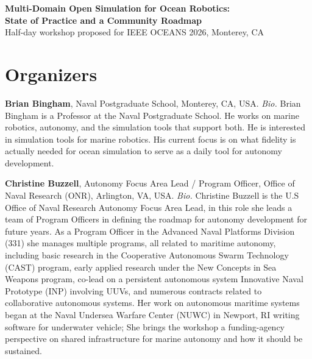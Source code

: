 \documentclass[10pt]{article}
\begin{document}
\vspace*{0.3in}

\begin{center}
  {\Large\bfseries Multi-Domain Open Simulation for Ocean Robotics:\\ State of Practice and a Community Roadmap}\\[2pt]
  {\small Half-day workshop proposed for IEEE OCEANS 2026, Monterey, CA}
\end{center}

\section{Organizers}

\textbf{Brian Bingham}, Naval Postgraduate School, Monterey, CA, USA.
\emph{Bio.} Brian Bingham is a Professor at the Naval Postgraduate School. He works on marine robotics, autonomy, and the simulation tools that support both. He is interested in simulation tools for marine robotics.  His current focus is on what fidelity is actually needed for ocean simulation to serve as a daily tool for autonomy development.

\textbf{Christine Buzzell}, Autonomy Focus Area Lead / Program Officer, Office of Naval Research (ONR), Arlington, VA, USA.
\emph{Bio.} Christine Buzzell is the U.S Office of Naval Research Autonomy Focus Area Lead, in this role she leads a team of Program Officers in defining the roadmap for autonomy development for future years. As a Program Officer in the Advanced Naval Platforms Division (331) she manages multiple programs, all related to maritime autonomy, including basic research in the Cooperative Autonomous Swarm Technology (CAST) program, early applied research under the New Concepts in Sea Weapons program, co-lead on a persistent autonomous system Innovative Naval Prototype (INP) involving UUVs, and numerous contracts related to collaborative autonomous systems. Her work on autonomous maritime systems began at the Naval Undersea Warfare Center (NUWC) in Newport, RI writing software for underwater vehicle; She brings the workshop a funding-agency perspective on shared infrastructure for marine autonomy and how it should be sustained.
\end{document}
